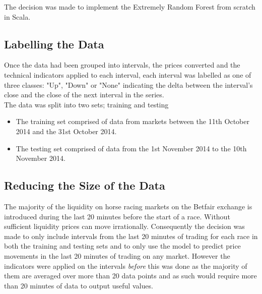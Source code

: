 	The decision was made to implement the Extremely Random Forest from scratch in Scala.\\
	
	\subsection{Labelling the Data}	
	
	Once the data had been grouped into intervals, the prices converted and the technical indicators applied to each interval, each interval was labelled as one of three classes: "Up", "Down" or "None" indicating the delta between the interval's close and the close of the next interval in the series.\\
	
	The data was split into two sets; training and testing
	\begin{itemize}
		\item The training set comprised of data from markets between the 11th October 2014 and the 31st October 2014.
		\item The testing set comprised of data from the 1st November 2014 to the 10th November 2014.
	\end{itemize}
	
	\subsection{Reducing the Size of the Data}
	
	The majority of the liquidity on horse racing markets on the Betfair exchange is introduced during the last 20 minutes before the start of a race. Without sufficient liquidity prices can move irrationally. Consequently the decision was made to only include intervals from the last 20 minutes of trading for each race in both the training and testing sets and to only use the model to predict price movements in the last 20 minutes of trading on any market. However the indicators were applied on the intervals \textit{before} this was done as the majority of them are averaged over more than 20 data points and as such would require more than 20 minutes of data to output useful values.	
	
